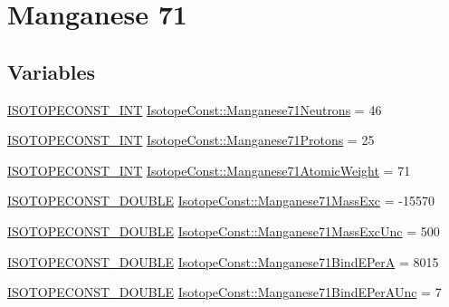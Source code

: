 \hypertarget{group___isotope_const-_manganese-_mn71}{}\section{Manganese 71}
\label{group___isotope_const-_manganese-_mn71}
\subsection*{Variables}
\begin{DoxyCompactItemize}
\item 
\mbox{\hyperlink{group___isotope_const-_macros_ga5f18360b3e99483a35c32d789e62621c}{I\+S\+O\+T\+O\+P\+E\+C\+O\+N\+S\+T\+\_\+\+I\+NT}} \mbox{\hyperlink{group___isotope_const-_manganese-_mn71_ga5d733b5342071d9d266c98a456740255}{Isotope\+Const\+::\+Manganese71\+Neutrons}} = 46
\item 
\mbox{\hyperlink{group___isotope_const-_macros_ga5f18360b3e99483a35c32d789e62621c}{I\+S\+O\+T\+O\+P\+E\+C\+O\+N\+S\+T\+\_\+\+I\+NT}} \mbox{\hyperlink{group___isotope_const-_manganese-_mn71_ga69b8ecfa4c979a82462fb73aa1c97448}{Isotope\+Const\+::\+Manganese71\+Protons}} = 25
\item 
\mbox{\hyperlink{group___isotope_const-_macros_ga5f18360b3e99483a35c32d789e62621c}{I\+S\+O\+T\+O\+P\+E\+C\+O\+N\+S\+T\+\_\+\+I\+NT}} \mbox{\hyperlink{group___isotope_const-_manganese-_mn71_ga4c6684dfadb1c6973ca895076769e23a}{Isotope\+Const\+::\+Manganese71\+Atomic\+Weight}} = 71
\item 
\mbox{\hyperlink{group___isotope_const-_macros_ga8f45a7272ce02c0b4c65c44636ed719a}{I\+S\+O\+T\+O\+P\+E\+C\+O\+N\+S\+T\+\_\+\+D\+O\+U\+B\+LE}} \mbox{\hyperlink{group___isotope_const-_manganese-_mn71_ga3ee9961676fcf4b64555e0442b4a0176}{Isotope\+Const\+::\+Manganese71\+Mass\+Exc}} = -\/15570
\item 
\mbox{\hyperlink{group___isotope_const-_macros_ga8f45a7272ce02c0b4c65c44636ed719a}{I\+S\+O\+T\+O\+P\+E\+C\+O\+N\+S\+T\+\_\+\+D\+O\+U\+B\+LE}} \mbox{\hyperlink{group___isotope_const-_manganese-_mn71_ga62d044cb2a8ac5a752b03e694faf4313}{Isotope\+Const\+::\+Manganese71\+Mass\+Exc\+Unc}} = 500
\item 
\mbox{\hyperlink{group___isotope_const-_macros_ga8f45a7272ce02c0b4c65c44636ed719a}{I\+S\+O\+T\+O\+P\+E\+C\+O\+N\+S\+T\+\_\+\+D\+O\+U\+B\+LE}} \mbox{\hyperlink{group___isotope_const-_manganese-_mn71_ga31b934f0f1fb351501760d1a202b42ac}{Isotope\+Const\+::\+Manganese71\+Bind\+E\+PerA}} = 8015
\item 
\mbox{\hyperlink{group___isotope_const-_macros_ga8f45a7272ce02c0b4c65c44636ed719a}{I\+S\+O\+T\+O\+P\+E\+C\+O\+N\+S\+T\+\_\+\+D\+O\+U\+B\+LE}} \mbox{\hyperlink{group___isotope_const-_manganese-_mn71_ga3fc31cb90e2da6772799e191682fd146}{Isotope\+Const\+::\+Manganese71\+Bind\+E\+Per\+A\+Unc}} = 7

\end{DoxyCompactItemize}
